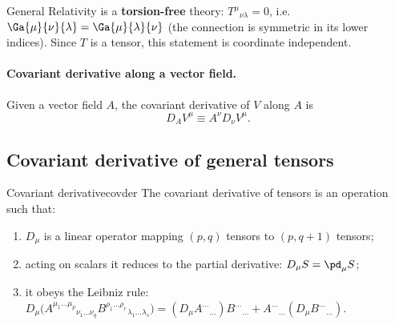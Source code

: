 \begin{keyresult}
General Relativity is a \textbf{torsion-free} theory: $T^\mu{}_{\nu\lambda}=0$, i.e.\ $\Ga{\mu}{\nu}{\lambda}=\Ga{\mu}{\lambda}{\nu}$ (the connection is symmetric in its lower indices). Since $T$ is a tensor, this statement is coordinate independent.
\end{keyresult}

\paragraph{Covariant derivative along a vector field.} Given a vector field $A$, the covariant derivative of $V$ along $A$ is
\begin{equation}
  D_AV^\mu\equiv A^\nu D_\nu V^\mu .
\end{equation}

\subsection{Covariant derivative of general tensors}

\begin{definition}{Covariant derivative}{covder}
The covariant derivative of tensors is an operation such that:
\begin{enumerate}[nosep]
\item $D_\mu$ is a linear operator mapping $(p,q)$ tensors to $(p,q+1)$ tensors;
\item acting on scalars it reduces to the partial derivative: $D_\mu S=\pd_\mu S$;
\item it obeys the Leibniz rule:
$D_\mu\big(A^{\mu_1\dots\mu_p}{}_{\nu_1\dots\nu_q}B^{\rho_1\dots\rho_r}{}_{\lambda_1\dots\lambda_s}\big)
=(D_\mu A^{\dots}{}_{\dots})B^{\dots}{}_{\dots}+A^{\dots}{}_{\dots}(D_\mu B^{\dots}{}_{\dots})$.
\end{enumerate}
\end{definition}

